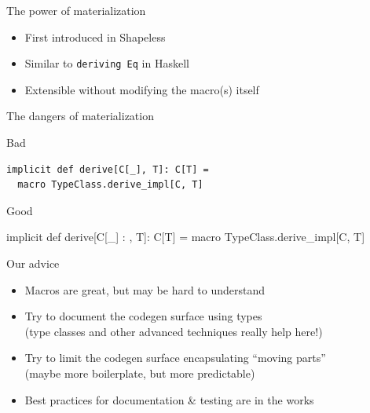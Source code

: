 \documentclass{beamer}
\begin{document}
\begin{frame}{The power of materialization}
  \begin{itemize}
    \item First introduced in Shapeless
    \item Similar to \texttt{deriving Eq} in Haskell
    \item Extensible without modifying the macro(s) itself
  \end{itemize}
\end{frame}

\begin{frame}[fragile]{The dangers of materialization}
  \vspace{1em}
  \begin{alertblock}{Bad}
    \begin{verbatim}
implicit def derive[C[_], T]: C[T] =
  macro TypeClass.derive_impl[C, T]
    \end{verbatim}
  \end{alertblock}

  \vspace{1em}
  \begin{exampleblock}{Good}
    \begin{semiverbatim}
implicit def derive[C[_] : \text{\color{blue}{TypeClass}}, T]: C[T] =
  macro TypeClass.derive_impl[C, T]
    \end{semiverbatim}
  \end{exampleblock}
\end{frame}

\begin{frame}[fragile]{Our advice}
  \begin{itemize}
    \item Macros are great, but may be hard to understand
    \item Try to document the codegen surface using types\\
      (type classes and other advanced techniques really help here!)
    \item Try to limit the codegen surface encapsulating ``moving parts''\\
      (maybe more boilerplate, but more predictable)
    \item Best practices for documentation \& testing are in the works
  \end{itemize}
\end{frame}

\end{document}
